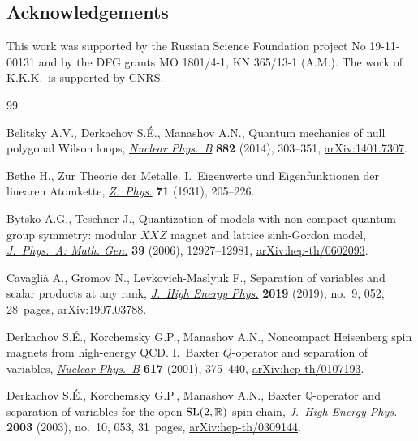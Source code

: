\documentclass[pdftex]{sigma}%
\numberwithin{equation}{section}
\begin{document}
\subsection*{Acknowledgements}

This work was supported by the Russian Science Foundation project No 19-11-00131 and by the DFG grants MO 1801/4-1, KN 365/13-1 (A.M.).
The work of K.K.K.\ is supported by CNRS.

\begin{thebibliography}{99}
\footnotesize\itemsep=0pt

Belitsky A.V., Derkachov S.\'E., Manashov A.N., Quantum mechanics of null
 polygonal {W}ilson loops, \href{https://doi.org/10.1016/j.nuclphysb.2014.03.007}{\textit{Nuclear Phys.~B}} \textbf{882} (2014),
 303--351, \href{https://arxiv.org/abs/1401.7307}{arXiv:1401.7307}.

Bethe H., Zur Theorie der Metalle. I.~Eigenwerte und Eigenfunktionen der
 linearen Atomkette, \href{https://doi.org/10.1007/BF01341708}{\textit{Z.~Phys.}} \textbf{71} (1931), 205--226.

Bytsko A.G., Teschner J., Quantization of models with non-compact quantum group
 symmetry: modular {$XXZ$} magnet and lattice sinh-{G}ordon model,
 \href{https://doi.org/10.1088/0305-4470/39/41/S11}{\textit{J.~Phys.~A: Math. Gen.}} \textbf{39} (2006), 12927--12981,
 \href{https://arxiv.org/abs/hep-th/0602093}{arXiv:hep-th/0602093}.

Cavagli\`a A., Gromov N., Levkovich-Maslyuk F., Separation of variables and
 scalar products at any rank, \href{https://doi.org/10.1007/jhep09(2019)052}{\textit{J.~High Energy Phys.}} \textbf{2019}
 (2019), no.~9, 052, 28~pages, \href{https://arxiv.org/abs/1907.03788}{arXiv:1907.03788}.

Derkachov S.\'E., Korchemsky G.P., Manashov A.N., Noncompact {H}eisenberg spin
 magnets from high-energy {QCD}. {I}.~{B}axter {$Q$}-operator and separation
 of variables, \href{https://doi.org/10.1016/S0550-3213(01)00457-6}{\textit{Nuclear Phys.~B}} \textbf{617} (2001), 375--440,
 \href{https://arxiv.org/abs/hep-th/0107193}{arXiv:hep-th/0107193}.

Derkachov S.\'E., Korchemsky G.P., Manashov A.N., Baxter {$\mathbb Q$}-operator
 and separation of variables for the open {${\rm SL}(2,{\mathbb R})$} spin
 chain, \href{https://doi.org/10.1088/1126-6708/2003/10/053}{\textit{J.~High Energy Phys.}} \textbf{2003} (2003), no.~10, 053,
 31~pages, \href{https://arxiv.org/abs/hep-th/0309144}{arXiv:hep-th/0309144}.


\end{thebibliography}
\end{document}
